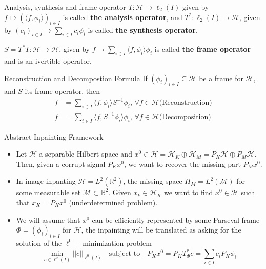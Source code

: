 \begin{frame}
\begin{block}{Analysis, synthesis and frame operator}
$T:\mathcal{H}\longrightarrow\ell_2(I)$ given by $f\mapsto (\langle f,\phi_i\rangle )_{i\in I}$ is called \textbf{the analysis operator}, and $T^*:\ell_2(I)\longrightarrow\mathcal{H}$, given by $(c_i)_{i\in I}\mapsto \sum_{i\in I}c_i\phi_i$ is called \textbf{the synthesis operator}.

$S=T^*T:\mathcal{H}\longrightarrow \mathcal{H}$, given by $f\mapsto \sum_{i\in I}\langle f,\phi_i\rangle \phi_i$ is called \textbf{the frame operator} and is an ivertible operator. 
\end{block}

\pause
\begin{block}{Reconstruction and Decompostion Formula}
If $(\phi_i)_{i\in I}\subseteq \mathcal{H}$ be a frame for $\mathcal{H}$, and $S$ its frame operator, then
$$
\begin{aligned}
f &=\sum_{i\in I}\langle f,\phi_i\rangle S^{-1}\phi_i \text{,  }\forall f\in\mathcal{H}\text{(Reconstruction)}\\
f &=\sum_{i\in I}\langle f,S^{-1}\phi_i\rangle\phi_i \text{,  }\forall f\in\mathcal{H}\text{(Decomposition)}
\end{aligned}
$$
\end{block}
\end{frame}

\begin{frame}{Abstract Inpainting Framework}
\begin{block}{}
\begin{itemize}
\item Let $\mathcal{H}$ a separable Hilbert space and $x^0\in\mathcal{H}=\mathcal{H}_K\oplus\mathcal{H}_M=P_K\mathcal{H}\oplus P_M\mathcal{H}$. Then, given a corrupt signal $P_K x^0$, we want to recover the missing part $P_Mx^0$.
\bigskip
\pause
\item In image inpanting $\mathcal{H}=L^2(\mathbb{R}^2)$, the missing space $H_M=L^2(\mathcal{M})$ for some measurable set $\mathcal{M}\subset \mathbb{R}^2$. Given $x_k\in \mathcal{H}_K$ we want to find $x^0\in\mathcal{H}$ such that $x_K=P_Kx^0$ (underdetermined problem).
\bigskip
\pause
\item We will assume that $x^0$ can be efficiently represented by some Parseval frame $\Phi=(\phi_i)_{i\in I}$ for $\mathcal{H}$, the inpainting will be translated as asking for the solution of the $\ell^0-$minimization problem
$$
\underset{c\in\ell^2(I)}{\min}||c||_{\ell^0(I)}\quad\textrm{subject to}\quad P_K x^0=P_KT_{\Phi}^*c=\sum_{i\in I}c_iP_K\phi_i
$$
\end{itemize}
\end{block}
\end{frame}

